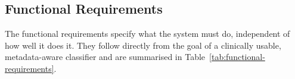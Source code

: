 %
%
%


\subsection{Functional Requirements}
\label{sec:functional-requirements}

The functional requirements specify what the system must do, independent of
how well it does it. They follow directly from the goal of a clinically
usable, metadata-aware classifier and are summarised in
Table~\ref{tab:functional-requirements}.

